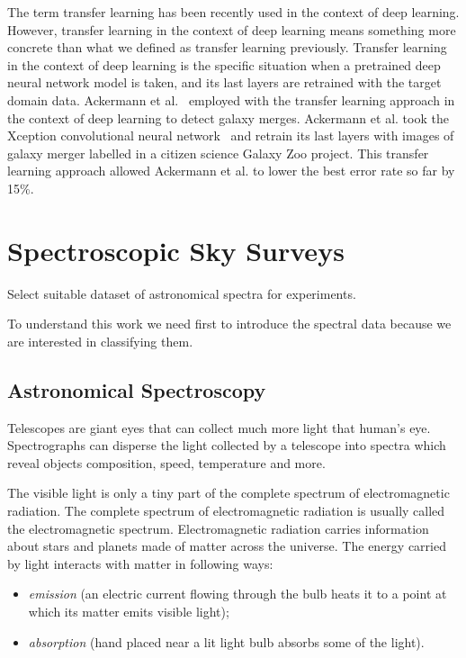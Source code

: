 \documentclass[thesis=M,english]{FITthesis}[2012/10/20]
\begin{document}
The term transfer learning has been recently used in the context of deep learning.
However, transfer learning in the context of deep learning means something more concrete than what we defined as transfer learning previously.
Transfer learning in the context of deep learning is the specific situation
when a pretrained deep neural network model is taken,
and its last layers are retrained with the target domain data.
Ackermann et al.~\cite{ackermann2018} employed with the transfer learning approach in the context of deep learning to detect galaxy merges.
Ackermann et al. took the Xception convolutional neural network~\cite{chollet2017}
and retrain its last layers with images of galaxy merger labelled in a citizen science Galaxy Zoo project.
This transfer learning approach allowed Ackermann et al. to lower the best error rate so far by 15\%.

\chapter{Spectroscopic Sky Surveys}
\label{data_chapter}


Select suitable dataset of astronomical spectra for experiments.

To understand this work we need first to introduce the spectral
data because we are interested in classifying them.

\section{Astronomical Spectroscopy}

Telescopes are giant eyes that can collect much more light that human's eye.
Spectrographs can disperse the light collected by a telescope into spectra
which reveal objects composition, speed, temperature and more.


The visible light is only a tiny part of the complete spectrum of electromagnetic radiation.
The complete spectrum of electromagnetic radiation is usually called the electromagnetic spectrum.
Electromagnetic radiation carries information about stars and planets made of matter across the universe.
The energy carried by light interacts with matter in following ways:

\begin{itemize}
	\item \textit{emission} (an electric current flowing through the bulb heats it to a point at
		which its matter emits visible light);
	\item \textit{absorption} (hand placed near a lit light bulb absorbs some of the light).
\end{itemize}
\end{document}
